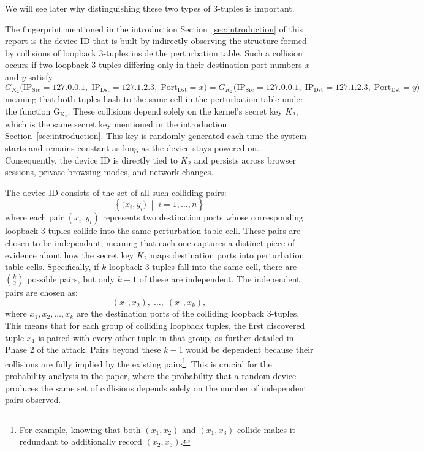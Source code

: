 \documentclass{report}
\begin{document}
We will see later why distinguishing these two types of 3-tuples is important.

The fingerprint mentioned in the introduction Section~\ref{sec:introduction} of this report is the \alert{device ID} that is built by indirectly observing the structure formed by \alert{collisions of loopback 3-tuples} inside the perturbation table. Such a collision occurs if two loopback 3-tuples differing only in their destination port numbers $x$ and $y$ satisfy
\begin{equation*}
	G_{K_{2}}\bigl(\mathrm{IP}_{\mathrm{Src}} = 127.0.0.1,\; \mathrm{IP}_{\mathrm{Dst}} = 127.1.2.3,\; \mathrm{Port}_{\mathrm{Dst}} = x \bigr)
	=
	G_{K_{2}}\bigl(\mathrm{IP}_{\mathrm{Src}} = 127.0.0.1,\; \mathrm{IP}_{\mathrm{Dst}} = 127.1.2.3,\; \mathrm{Port}_{\mathrm{Dst}} = y \bigr)
\end{equation*}
meaning that both tuples hash to the same cell in the perturbation table under the function $\mathrm{G_{K_2}}$. These collisions depend solely on the kernel’s \alert{secret key} $K_2$, which is the same secret key mentioned in the introduction Section~\ref{sec:introduction}. This key is randomly generated each time the \alert{system starts} and remains constant as long as the device stays powered on. Consequently, the device ID is directly tied to $K_2$ and persists across browser sessions, private browsing modes, and network changes.

The device ID consists of the set of all such colliding pairs:
\[
	\left\{ \bigl(x_i, y_i\bigr) \;\middle|\; i = 1, \ldots, n \right\}
\]
where each pair $(x_i, y_i)$ represents \alert{two destination ports} whose corresponding loopback 3-tuples collide into the same perturbation table cell. These pairs are chosen to be \alert{\hypertarget{independant}{independant}}, meaning that each one captures a distinct piece of evidence about how the secret key $K_2$ maps destination ports into perturbation table cells. Specifically, if $k$ loopback 3-tuples fall into the same cell, there are $\binom{k}{2}$ possible pairs, but only $k-1$ of these are independent. The independent pairs are chosen as:
\[
	(x_1, x_2),\; \ldots,\; (x_1, x_k),
\]
where $x_1, x_2, \ldots, x_k$ are the destination ports of the colliding loopback 3-tuples. This means that for each group of colliding loopback tuples, the first discovered tuple $x_1$ is paired with every other tuple in that group, as further detailed in Phase 2 of the attack. Pairs beyond these $k-1$ would be \alert{dependent} because their collisions are fully implied by the existing pairs\footnote{For example, knowing that both $(x_1, x_2)$ and $(x_1, x_3)$ collide makes it redundant to additionally record $(x_2, x_3)$.}. This is crucial for the probability analysis in the paper, where the probability that a random device produces the same set of collisions depends solely on the number of independent pairs observed.
\end{document}
